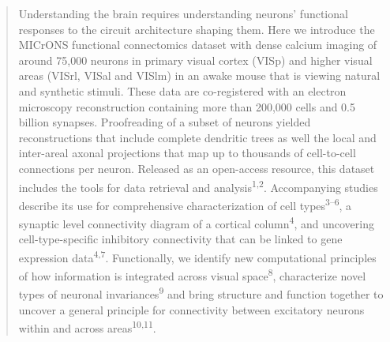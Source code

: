 \documentclass{article}
\begin{document}
\begin{quote}
Understanding the brain requires understanding neurons’ functional responses to the circuit architecture shaping them. Here we introduce the MICrONS functional connectomics dataset with dense calcium imaging of around 75,000 neurons in primary visual cortex (VISp) and higher visual areas (VISrl, VISal and VISlm) in an awake mouse that is viewing natural and synthetic stimuli. These data are co-registered with an electron microscopy reconstruction containing more than 200,000 cells and 0.5 billion synapses. Proofreading of a subset of neurons yielded reconstructions that include complete dendritic trees as well the local and inter-areal axonal projections that map up to thousands of cell-to-cell connections per neuron. Released as an open-access resource, this dataset includes the tools for data retrieval and analysis\textsuperscript{1,2}. Accompanying studies describe its use for comprehensive characterization of cell types\textsuperscript{3–6}, a synaptic level connectivity diagram of a cortical column\textsuperscript{4}, and uncovering cell-type-specific inhibitory connectivity that can be linked to gene expression data\textsuperscript{4,7}. Functionally, we identify new computational principles of how information is integrated across visual space\textsuperscript{8}, characterize novel types of neuronal invariances\textsuperscript{9} and bring structure and function together to uncover a general principle for connectivity between excitatory neurons within and across areas\textsuperscript{10,11}.
\end{quote}
\end{document}
